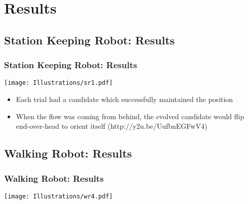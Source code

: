 \documentclass{beamer}
\begin{document}


\section{Results}
\subsection*{Station Keeping Robot: Results} %
\begin{frame}
  \frametitle{Station Keeping Robot: Results}
  \begin{center}
  \texttt{[image: Illustrations/sr1.pdf]}
       \\
    \end{center}
  \begin{itemize}
    \item Each trial had a candidate which successfully maintained the position
        \item When the flow was coming from behind, the evolved candidate would flip end-over-head to orient itself (http://y2u.be/UufbnEGFwV4)
  \end{itemize}
\end{frame}

\subsection*{Walking Robot: Results}
\begin{frame}
  \frametitle{Walking Robot: Results}

\begin{center}
 \texttt{[image: Illustrations/wr4.pdf]}
       \\
\end{center}
\end{frame}
\end{document}
